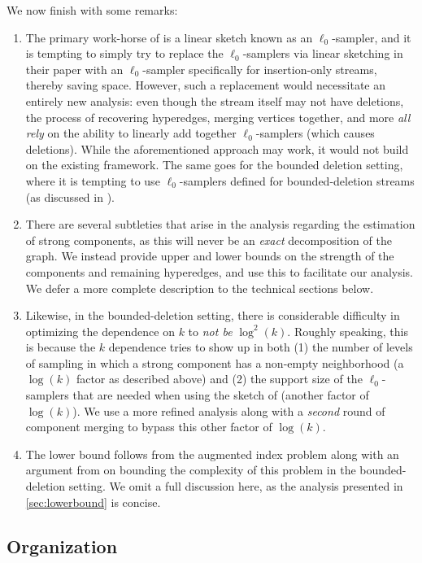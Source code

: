 \documentclass[11pt]{article}
\theoremstyle{definition}
\begin{document}
We now finish with some remarks:

\begin{enumerate}
    \item The primary work-horse of \cite{KPS24d} is a linear sketch known as an $\ell_0$-sampler, and it is tempting to simply try to replace the $\ell_0$-samplers via linear sketching in their paper with an $\ell_0$-sampler specifically for insertion-only streams, thereby saving space. However, such a replacement would necessitate an entirely new analysis: even though the stream itself may not have deletions, the process of recovering hyperedges, merging vertices together, and more \emph{all rely} on the ability to linearly add together $\ell_0$-samplers (which causes deletions). While the aforementioned approach may work, it would not build on the existing framework. The same goes for the bounded deletion setting, where it is tempting to use $\ell_0$-samplers defined for bounded-deletion streams (as discussed in \cite{JW18}).
    \item There are several subtleties that arise in the analysis regarding the estimation of strong components, as this will never be an \emph{exact} decomposition of the graph. We instead provide upper and lower bounds on the strength of the components and remaining hyperedges, and use this to facilitate our analysis. We defer a more complete description to the technical sections below. 
    \item Likewise, in the bounded-deletion setting, there is considerable difficulty in optimizing the dependence on $k$ to \emph{not be} $\log^2(k)$. Roughly speaking, this is because the $k$ dependence tries to show up in both (1) the number of levels of sampling in which a strong component has a non-empty neighborhood (a $\log(k)$ factor as described above) and (2) the support size of the $\ell_0$-samplers that are needed when using the sketch of \cite{KPS24d} (another factor of $\log(k)$). We use a more refined analysis along with a \emph{second} round of component merging to bypass this other factor of $\log(k)$.
    \item The lower bound follows from the augmented index problem along with an argument from \cite{JW18} on bounding the complexity of this problem in the bounded-deletion setting. We omit a full discussion here, as the analysis presented in \cref{sec:lowerbound} is concise.
\end{enumerate}

\subsection{Organization}
\end{document}
